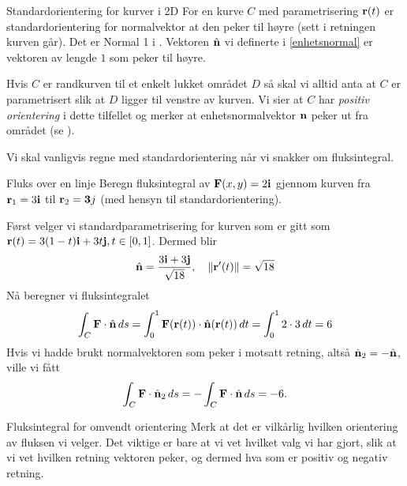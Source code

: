 \begin{oppsum}{Standardorientering for kurver i 2D}
For en kurve $C$ med parametrisering $\mathbf{r}(t)$ er standardorientering for normalvektor at den peker til høyre (sett i retningen kurven går). Det er Normal 1 i .
Vektoren $\hat{\mathbf{n}}$ vi definerte i \eqref{enhetsnormal} er vektoren av lengde $1$ som peker til høyre.

Hvis $C$ er randkurven til et enkelt lukket området $D$ så skal vi alltid anta at $C$ er parametrisert slik at $D$ ligger til venstre av kurven. Vi sier at \( C \) har \emph{positiv orientering} i dette tilfellet og merker at enhetsnormalvektor $\mathbf{n}$ peker ut fra området (se ).
\end{oppsum}
%
Vi skal vanligvis regne med standardorientering når vi snakker om fluksintegral.

\begin{eks}{Fluks over en linje}
Beregn fluksintegral av $\mathbf{F}(x,y)=2\mathbf{i}$ gjennom kurven fra $\mathbf{r}_1=3\mathbf{i}$ til $\mathbf{r}_2=\mathbf{3}j$ (med hensyn til standardorientering).

Først velger vi standardparametrisering for kurven som er gitt som $\mathbf{r}(t)=3(1-t)\mathbf{i}+3t\mathbf{j}, t \in [0,1]$. 
Dermed blir 
\[\hat{\mathbf{n}} = \frac{3 \mathbf{i}+3\mathbf{j}}{\sqrt{18}}, \quad \lVert \mathbf{r}'(t)\rVert = \sqrt{18}\]
Nå beregner vi fluksintegralet
\[\int_C \mathbf{F} \cdot \hat{\mathbf{n}}\, ds = \int_0^1 \mathbf{F}(\mathbf{r}(t))\cdot \hat{\mathbf{n}}(\mathbf{r}(t)) \,dt= \int_0^12\cdot 3 \, dt = 6\]
Hvis vi hadde brukt normalvektoren som peker i motsatt retning, altså $\hat{\mathbf{n}}_2=-\hat{\mathbf{n}}$, ville vi fått
\[\int_C \mathbf{F} \cdot \hat{\mathbf{n}}_2\, ds = -\int_C\mathbf{F} \cdot \hat{\mathbf{n}}\, ds =-6.\]
\end{eks}

\begin{rem}{Fluksintegral for omvendt orientering}
Merk at det er vilkårlig hvilken orientering av fluksen vi velger. Det viktige er bare at vi vet hvilket valg vi har gjort, slik at vi vet hvilken retning vektoren peker, og dermed hva som er positiv og negativ retning.
\end{rem}

%
